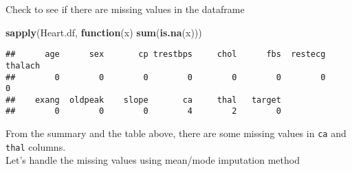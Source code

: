 \documentclass[
]{article}
\newenvironment{Shaded}{\begin{snugshade}}{\end{snugshade}}
\newcommand{\ControlFlowTok}[1]{\textcolor[rgb]{0.13,0.29,0.53}{\textbf{#1}}}
\newcommand{\DecValTok}[1]{\textcolor[rgb]{0.00,0.00,0.81}{#1}}
\newcommand{\FunctionTok}[1]{\textcolor[rgb]{0.13,0.29,0.53}{\textbf{#1}}}
\newcommand{\NormalTok}[1]{#1}
\newcommand{\OtherTok}[1]{\textcolor[rgb]{0.56,0.35,0.01}{#1}}
\newcommand{\SpecialCharTok}[1]{\textcolor[rgb]{0.81,0.36,0.00}{\textbf{#1}}}
\begin{document}
\begin{Shaded}
\end{Shaded}

Check to see if there are missing values in the dataframe

\begin{Shaded}
\begin{Highlighting}[]
\FunctionTok{sapply}\NormalTok{(Heart.df, }\ControlFlowTok{function}\NormalTok{(x) }\FunctionTok{sum}\NormalTok{(}\FunctionTok{is.na}\NormalTok{(x)))}
\end{Highlighting}
\end{Shaded}

\begin{verbatim}
##      age      sex       cp trestbps     chol      fbs  restecg  thalach 
##        0        0        0        0        0        0        0        0 
##    exang  oldpeak    slope       ca     thal   target 
##        0        0        0        4        2        0
\end{verbatim}

From the summary and the table above, there are some missing values in
\texttt{ca} and \texttt{thal} columns.\\
Let's handle the missing values using mean/mode imputation method
\end{document}
